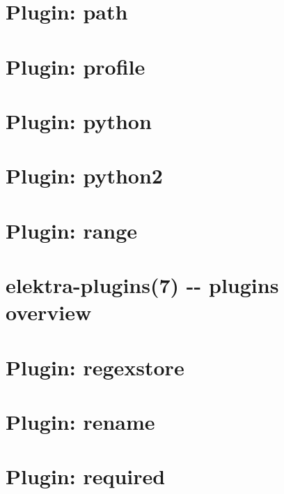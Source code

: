 \documentclass[twoside]{book}
\newcommand{\+}{\discretionary{\mbox{\scriptsize$\hookleftarrow$}}{}{}}
\begin{document}
\chapter{Plugin\+: path}
\label{md_src_plugins_path_README}

\chapter{Plugin\+: profile}
\label{md_src_plugins_profile_README}

\chapter{Plugin\+: python}
\label{md_src_plugins_python_README}

\chapter{Plugin\+: python2}
\label{md_src_plugins_python2_README}

\chapter{Plugin\+: range}
\label{md_src_plugins_range_README}

\chapter{elektra-\/plugins(7) -\/-\/ plugins overview}
\label{md_src_plugins_README}

\chapter{Plugin\+: regexstore}
\label{md_src_plugins_regexstore_README}

\chapter{Plugin\+: rename}
\label{md_src_plugins_rename_README}

\chapter{Plugin\+: required}
\label{md_src_plugins_required_README}

\end{document}
